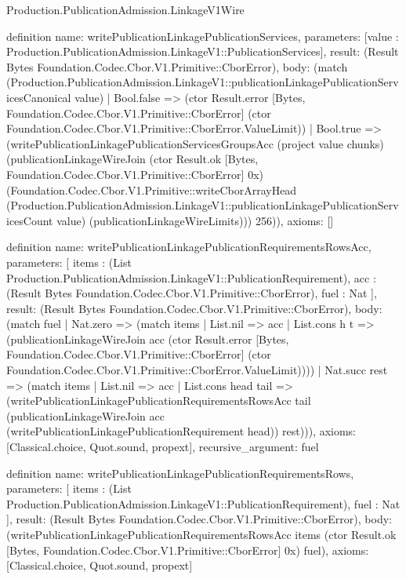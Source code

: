\begin{lexlean}{Production.PublicationAdmission.LinkageV1Wire}
\begin{semanticmodule}
definition{
  name: writePublicationLinkagePublicationServices,
  parameters: [value : Production.PublicationAdmission.LinkageV1::PublicationServices],
  result: (Result Bytes Foundation.Codec.Cbor.V1.Primitive::CborError),
  body: (match (Production.PublicationAdmission.LinkageV1::publicationLinkagePublicationServicesCanonical value)
    | Bool.false => (ctor Result.error [Bytes, Foundation.Codec.Cbor.V1.Primitive::CborError] (ctor Foundation.Codec.Cbor.V1.Primitive::CborError.ValueLimit))
    | Bool.true => (writePublicationLinkagePublicationServicesGroupsAcc (project value chunks) (publicationLinkageWireJoin (ctor Result.ok [Bytes, Foundation.Codec.Cbor.V1.Primitive::CborError] 0x) (Foundation.Codec.Cbor.V1.Primitive::writeCborArrayHead (Production.PublicationAdmission.LinkageV1::publicationLinkagePublicationServicesCount value) (publicationLinkageWireLimits))) 256)),
  axioms: []
}

definition{
  name: writePublicationLinkagePublicationRequirementsRowsAcc,
  parameters: [
    items : (List Production.PublicationAdmission.LinkageV1::PublicationRequirement),
    acc : (Result Bytes Foundation.Codec.Cbor.V1.Primitive::CborError),
    fuel : Nat
  ],
  result: (Result Bytes Foundation.Codec.Cbor.V1.Primitive::CborError),
  body: (match fuel
    | Nat.zero => (match items
      | List.nil => acc
      | List.cons h t => (publicationLinkageWireJoin acc (ctor Result.error [Bytes, Foundation.Codec.Cbor.V1.Primitive::CborError] (ctor Foundation.Codec.Cbor.V1.Primitive::CborError.ValueLimit))))
    | Nat.succ rest => (match items
      | List.nil => acc
      | List.cons head tail => (writePublicationLinkagePublicationRequirementsRowsAcc tail (publicationLinkageWireJoin acc (writePublicationLinkagePublicationRequirement head)) rest))),
  axioms: [Classical.choice, Quot.sound, propext],
  recursive_argument: fuel
}

definition{
  name: writePublicationLinkagePublicationRequirementsRows,
  parameters: [
    items : (List Production.PublicationAdmission.LinkageV1::PublicationRequirement),
    fuel : Nat
  ],
  result: (Result Bytes Foundation.Codec.Cbor.V1.Primitive::CborError),
  body: (writePublicationLinkagePublicationRequirementsRowsAcc items (ctor Result.ok [Bytes, Foundation.Codec.Cbor.V1.Primitive::CborError] 0x) fuel),
  axioms: [Classical.choice, Quot.sound, propext]
}


\end{semanticmodule}
\end{lexlean}
